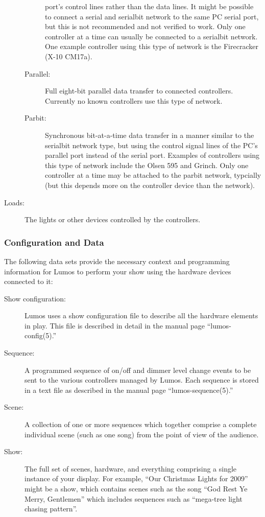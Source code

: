 \documentclass{article}
\begin{document}
\begin{description}
\begin{description}
				port's control lines rather than the data lines.  It might be
				possible to connect a serial and serialbit network to the same
				PC serial port, but this is not recommended and not verified
				to work.  Only one controller at a time can usually be 
				connected to a serialbit network.
				One example controller using this type of network is the
				Firecracker (X-10 CM17a).
			\item[Parallel:]
				Full eight-bit parallel data transfer to connected
				controllers.
				Currently no known controllers use this type of network.
			\item[Parbit:]
				Synchronous bit-at-a-time data transfer in a manner similar
				to the serialbit network type, but using the control signal
				lines of the PC's parallel port instead of the serial port.
				Examples of controllers using this type of network include the
				Olsen 595 and Grinch.  Only one controller at a time may be
				attached to the parbit network, typcially (but this depends
				more on the controller device than the network).
		\end{description}
	\item[Loads:]
		The lights or other devices controlled by the controllers.
\end{description}

\subsubsection{Configuration and Data}
The following data sets provide the necessary context and programming
information for Lumos to perform your show using the hardware devices
connected to it:

\begin{description}
	\item[Show configuration:]
		Lumos uses a show configuration file to describe all the hardware
		elements in play.  This file is described in detail in the manual page
		``lumos-config(5).''
	\item[Sequence:]
		A programmed sequence of on/off and dimmer level change events
		to be sent to the various controllers managed by Lumos.  Each 
		sequence is stored in a text file as described in the manual page
		``lumos-sequence(5).''
	\item[Scene:]
		A collection of one or more sequences which together comprise a
		complete individual scene (such as one song) from the point of view of
		the audience.
	\item[Show:]
		The full set of scenes, hardware, and everything comprising a single
		instance of your display.  For example, ``Our Christmas Lights for
		2009'' might be a show, which contains scenes such as the song ``God
		Rest Ye Merry, Gentlemen'' which includes sequences such as
		``mega-tree light chasing pattern''.
\end{description}
\end{document}
